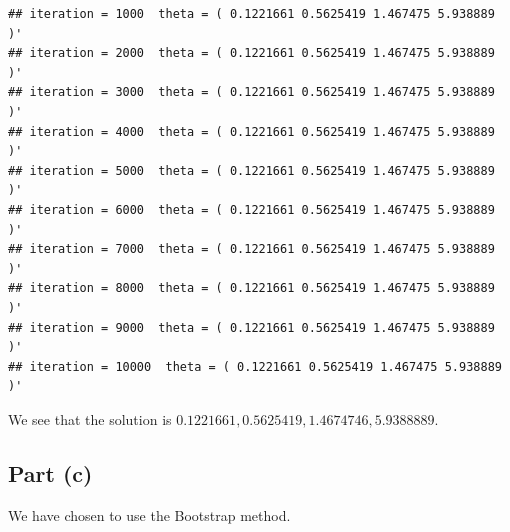 \documentclass[
]{article}
\begin{document}
\begin{verbatim}
## iteration = 1000  theta = ( 0.1221661 0.5625419 1.467475 5.938889 )'
## iteration = 2000  theta = ( 0.1221661 0.5625419 1.467475 5.938889 )'
## iteration = 3000  theta = ( 0.1221661 0.5625419 1.467475 5.938889 )'
## iteration = 4000  theta = ( 0.1221661 0.5625419 1.467475 5.938889 )'
## iteration = 5000  theta = ( 0.1221661 0.5625419 1.467475 5.938889 )'
## iteration = 6000  theta = ( 0.1221661 0.5625419 1.467475 5.938889 )'
## iteration = 7000  theta = ( 0.1221661 0.5625419 1.467475 5.938889 )'
## iteration = 8000  theta = ( 0.1221661 0.5625419 1.467475 5.938889 )'
## iteration = 9000  theta = ( 0.1221661 0.5625419 1.467475 5.938889 )'
## iteration = 10000  theta = ( 0.1221661 0.5625419 1.467475 5.938889 )'
\end{verbatim}

We see that the solution is
\(0.1221661, 0.5625419, 1.4674746, 5.9388889\).

\hypertarget{part-c-1}{%
\subsection{Part (c)}\label{part-c-1}}


We have chosen to use the Bootstrap method.
\end{document}
